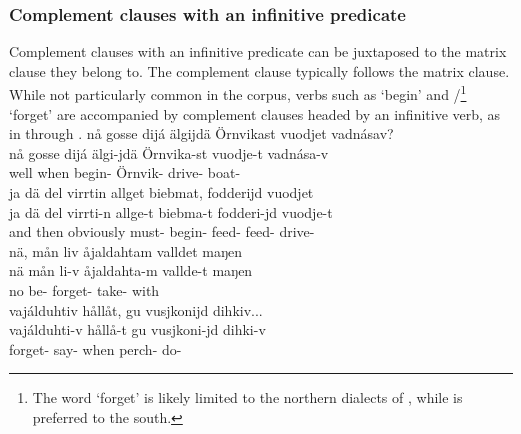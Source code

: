 \subsubsection{Complement clauses with an infinitive predicate}\label{infinitiveComplementClauses}
Complement clauses with an infinitive predicate can be juxtaposed to the matrix clause they belong to. The complement clause typically follows the matrix clause. 
While not particularly common in the corpus, verbs such as  ‘begin’ and /\footnote{The word  ‘forget’ is likely limited to the northern dialects of \PS, while  is preferred to the south.} 
‘forget’ %
are accompanied by complement clauses headed by an infinitive verb, %
as in  through .
\ea\label{complClauseJuxInf1}
\glll	nå gosse dijá älgijdä Örnvikast vuodjet vadnásav?\\
	nå gosse dijá älgi-jdä Örnvika-st vuodje-t vadnása-v\\
	well when  begin- Örnvik- drive- boat-\\\nopagebreak
{} 
\z
\ea\label{complClauseJuxInf2}
\glll	ja dä del virrtin allget biebmat, fodderijd vuodjet\\
	ja dä del virrti-n allge-t biebma-t fodderi-jd vuodje-t\\
	and then obviously must- begin- feed- feed- drive-\\\nopagebreak
{} 
\z
\ea\label{complClauseJuxInf3}%
\glll	nä, mån liv åjaldahtam valldet maŋen\\
	nä mån li-v åjaldahta-m vallde-t maŋen\\
	no  be- forget- take- with\\\nopagebreak
{} 
\z
\ea\label{complClauseJuxInf4}%
\glll	vajálduhtiv hållåt, gu vusjkonijd dihkiv...\\
	vajálduhti-v hållå-t gu vusjkoni-jd dihki-v\\
	forget- say- when perch- do-\\\nopagebreak
{} 
\z




